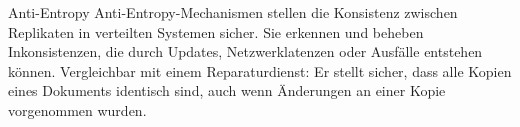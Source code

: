 \documentclass{beamer}
\begin{document}
\begin{frame}{Anti-Entropy}
    Anti-Entropy-Mechanismen stellen die Konsistenz zwischen Replikaten in verteilten Systemen sicher. \newline
    Sie erkennen und beheben Inkonsistenzen, die durch Updates, Netzwerklatenzen oder Ausfälle entstehen können. \newline
    Vergleichbar mit einem Reparaturdienst: Er stellt sicher, dass alle Kopien eines Dokuments identisch sind, auch wenn Änderungen an einer Kopie vorgenommen wurden.
\end{frame}
\end{document}
